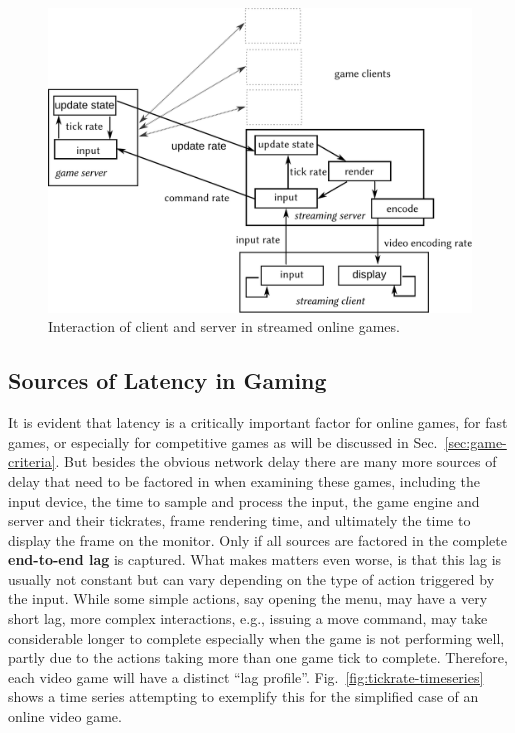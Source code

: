 \begin{figure}[!t]
	\centering
	\includegraphics[width=1.0\columnwidth]{../models/game-tick-rate-streamed.pdf}
	\caption{Interaction of client and server in streamed online games.}
\label{fig:tickrate-streamed}
\end{figure}


\subsection{Sources of Latency in Gaming}
\label{sec:latency}

It is evident that latency is a critically important factor for online games, for fast games, or especially for competitive games as will be discussed in Sec.~\ref{sec:game-criteria}. But besides the obvious network delay there are many more sources of delay that need to be factored in when examining these games, including the input device, the time to sample and process the input, the game engine and server and their tickrates, frame rendering time, and ultimately the time to display the frame on the monitor. Only if all sources are factored in the complete \textbf{end-to-end lag} is captured. What makes matters even worse, is that this lag is usually not constant but can vary depending on the type of action triggered by the input. While some simple actions, say opening the menu, may have a very short lag, more complex interactions, e.g., issuing a move command, may take considerable longer to complete especially when the game is not performing well, partly due to the actions taking more than one game tick to complete. Therefore, each video game will have a distinct ``lag profile''.  Fig.~\ref{fig:tickrate-timeseries} shows a time series attempting to exemplify this for the simplified case of an online video game.


